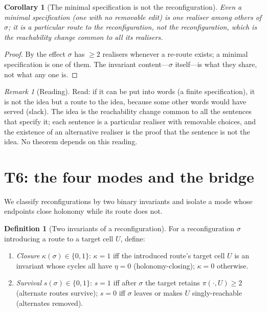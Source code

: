 \documentclass[11pt,a4paper]{article}
\theoremstyle{thmstyle}
\newtheorem{corollary}[theorem]{Corollary}
\theoremstyle{definition}
\newtheorem{definition}[theorem]{Definition}
\theoremstyle{remark}
\newtheorem{remark}[theorem]{Remark}
\newcommand{\hol}{\eta}            %
\newcommand{\reshuffle}{\sigma}    %
\begin{document}
\begin{corollary}[The minimal specification is not the reconfiguration]
\label{cor:notthething}
Even a minimal specification (one with no removable edit) is one realiser
among others of $\reshuffle$; it is a particular route to the
reconfiguration, not the reconfiguration, which is the reachability change
common to all its realisers.
\end{corollary}

\begin{proof}
By  the effect $\reshuffle$ has $\ge2$ realisers whenever a
re-route exists; a minimal specification is one of them. The invariant
content---$\reshuffle$ itself---is what they share, not what any one is.
\end{proof}

\begin{remark}[Reading]
\label{rem:slack-read}
Read: if it can be put into words (a finite specification), it is not the
idea but a route to the idea, because some other words would have served
(slack). The idea is the reachability change common to all the sentences
that specify it; each sentence is a particular realiser with removable
choices, and the existence of an alternative realiser is the proof that the
sentence is not the idea. No theorem depends on this reading.
\end{remark}

\section{T6: the four modes and the bridge}
\label{sec:modes}

We classify reconfigurations by two binary invariants and isolate a mode
whose endpoints close holonomy while its route does not.

\begin{definition}[Two invariants of a reconfiguration]
\label{def:twoinv}
For a reconfiguration $\reshuffle$ introducing a route to a target cell $U$,
define:
\begin{enumerate}[label=\textup{(\alph*)},leftmargin=2.2em]
\item \emph{Closure} $\kappa(\reshuffle)\in\{0,1\}$: $\kappa=1$ iff the
introduced route's target cell $U$ is an invariant whose cycles all have
$\hol=0$ (holonomy-closing); $\kappa=0$ otherwise.
\item \emph{Survival} $s(\reshuffle)\in\{0,1\}$: $s=1$ iff after
$\reshuffle$ the target retains $\pi(\cdot,U)\ge2$ (alternate routes
survive); $s=0$ iff $\reshuffle$ leaves or makes $U$ singly-reachable
(alternates removed).
\end{enumerate}
\end{definition}
\end{document}
